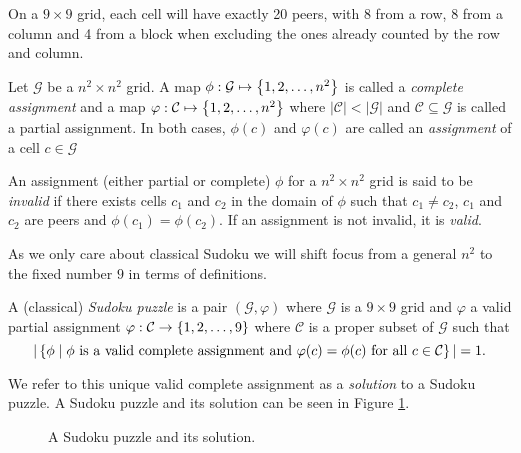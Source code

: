 On a $9 \times 9$ grid, each cell will have exactly 20 peers, with 8 from a row, 8 from a column and 4 from a block when excluding the ones already counted by the row and column.

\begin{definition}
Let $\mathcal{G}$ be a $n^2\times n^2$ grid. A map $\phi: \mathcal{G} \mapsto \left\{1,2,\ldots,n^2\right\}$ is called a \emph{complete assignment} and a map $\varphi: \mathcal{C} \mapsto \left\{1,2,\ldots,n^2\right\}$ where $|\mathcal{C}| < |\mathcal{G}|$ and $\mathcal{C} \subseteq \mathcal{G}$ is called a partial assignment. In both cases, $\phi(c)$ and $\varphi(c)$ are called an \emph{assignment} of a cell $c\in\mathcal{G}$
\end{definition}

\begin{definition}
An assignment (either partial or complete) $\phi$ for a $n^2 \times n^2$ grid is said to be \emph{invalid} if there exists cells $c_1$ and $c_2$ in the domain of $\phi$ such that $c_1 \neq c_2$, $c_1$ and $c_2$ are peers and $\phi(c_1) = \phi(c_2)$. If an assignment is not invalid, it is \emph{valid}.
\end{definition}

As we only care about classical Sudoku we will shift focus from a general $n^2$ to the fixed number $9$ in terms of definitions.

\begin{definition}
A (classical) \emph{Sudoku puzzle} is a pair $(\mathcal{G}, \varphi)$ where $\mathcal{G}$ is a $9\times 9$ grid and $\varphi$ a valid partial assignment $\varphi: \mathcal{C} \to \left\{1,2,\ldots,9\right\}$ where $\mathcal{C}$ is a proper subset of $\mathcal{G}$ such that
\[
    |\left\{\phi \mid \phi \text{ is a valid complete assignment and }\varphi(c) = \phi(c)\text{ for all }c\in\mathcal{C}\right\}|=1.
\]
\end{definition}

We refer to this unique valid complete assignment as a \emph{solution} to a Sudoku puzzle. A Sudoku puzzle and its solution can be seen in Figure \ref{fig:sudpuzsol}.

\begin{center}
  \begin{figure}[ht]
    \centering
    \def\scale{.6} %
    
    \caption{A Sudoku puzzle and its solution.}
    \label{fig:sudpuzsol}
  \end{figure}
\end{center}

